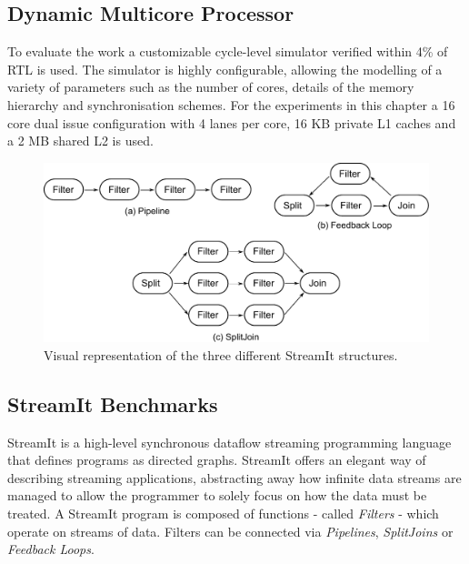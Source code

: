 \subsection{Dynamic Multicore Processor}

To evaluate the work a customizable cycle-level simulator verified within 4\% of RTL is used.
The simulator is highly configurable, allowing the modelling of a variety of parameters such as the number of cores, details of the memory hierarchy and synchronisation schemes.
For the experiments in this chapter a 16 core dual issue configuration with 4 lanes per core, 16 KB private L1 caches and a 2 MB shared L2 is used.

\begin{figure}
    \centering
    \includegraphics[width=1\textwidth]{streamit-paper/graphics/streamit_types.pdf}
    \caption{Visual representation of the three different StreamIt structures.}
    \label{fig:streamittypes}
\end{figure}
\subsection{StreamIt Benchmarks}

StreamIt is a high-level synchronous dataflow streaming programming language that defines programs as directed graphs.
StreamIt offers an elegant way of describing streaming applications, abstracting away how infinite data streams are managed to allow the programmer to solely focus on how the data must be treated.
A StreamIt program is composed of functions - called \textit{Filters} - which operate on streams of data.
Filters can be connected via \textit{Pipelines}, \textit{SplitJoins} or \textit{Feedback Loops}.

